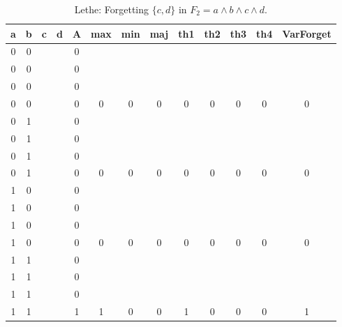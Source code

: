 \begin{table}[!tb]
    \centering
    \begin{tabular}{|c|c|c|c|c|c|c|c|c|c|c|c|c|}
        \hline
        \textbf{a} & \textbf{b} & \textbf{c} & \textbf{d} & \textbf{A} & \textbf{max} & \textbf{min} & \textbf{maj} & \textbf{th1} & \textbf{th2} & \textbf{th3} & \textbf{th4} & \textbf{VarForget} \\ \hline
        \rowcolor{gray!40} 0 & 0 &  &  & 0 &  &  &  &  &  &  &  &  \\ \hline
        \rowcolor{gray!40} 0 & 0 &  &  & 0 &  &  &  &  &  &  &  &  \\ \hline
        \rowcolor{gray!40} 0 & 0 &  &  & 0 &  &  &  &  &  &  &  &  \\ \hline
        \rowcolor{gray!40} 0 & 0 &  &  & 0 & 0 & 0 & 0 & 0 & 0 & 0 & 0 & 0 \\ \hline
        \rowcolor{blue!40} 0 & 1 &  &  & 0 &  &  &  &  &  &  &  &  \\ \hline
        \rowcolor{blue!40} 0 & 1 &  &  & 0 &  &  &  &  &  &  &  &  \\ \hline
        \rowcolor{blue!40} 0 & 1 &  &  & 0 &  &  &  &  &  &  &  &  \\ \hline
        \rowcolor{blue!40} 0 & 1 &  &  & 0 & 0 & 0 & 0 & 0 & 0 & 0 & 0 & 0 \\ \hline
        \rowcolor{red!40} 1 & 0 &  &  & 0 &  &  &  &  &  &  &  &  \\ \hline
        \rowcolor{red!40} 1 & 0 &  &  & 0 &  &  &  &  &  &  &  &  \\ \hline
        \rowcolor{red!40} 1 & 0 &  &  & 0 &  &  &  &  &  &  &  &  \\ \hline
        \rowcolor{red!40} 1 & 0 &  &  & 0 & 0 & 0 & 0 & 0 & 0 & 0 & 0 & 0 \\ \hline
        \rowcolor{green!40} 1 & 1 &  &  & 0 &  &  &  &  &  &  &  &  \\ \hline
        \rowcolor{green!40} 1 & 1 &  &  & 0 &  &  &  &  &  &  &  &  \\ \hline
        \rowcolor{green!40} 1 & 1 &  &  & 0 &  &  &  &  &  &  &  &  \\ \hline
        \rowcolor{green!40} 1 & 1 &  &  & 1 & 1 & 0 & 0 & 1 & 0 & 0 & 0 & 1 \\ \hline
    \end{tabular}
    \caption{Lethe: Forgetting $\{c, d\}$ in $F_{2} = a \land b \land c \land d$.}
    \label{tab:lethe-F2-cd}
\end{table}
